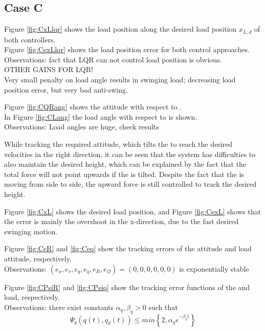 \newpage
\subsection*{Case C}

Figure \ref{fig:CxLlqr} shows the load position along the desired load position $ x_{L,d} $ of both controllers.\\
Figure \ref{fig:CexLlqr} shows the load position error for both control approaches.\\
Observations: fact that LQR can not control load position is obvious.\\
OTHER GAINS FOR LQR!\\
Very small penalty on load angle results in swinging load; decreasing load position error, but very bad anti-swing. 

Figure \ref{fig:CQRang} shows the  attitude with respect to \IF.\\
In Figure \ref{fig:CLang} the load angle with respect to \BF is shown. \\
Observations: Load angles are huge, check results

While tracking the required  attitude, which tilts the  to reach the desired velocities in the right direction, it can be seen that the system has difficulties to also maintain the desired height, which can be explained by the fact that the total force will not point upwards if the  is tilted. Despite the fact that the  is  moving from side to side, the upward force is still controlled to track the desired height. 

Figure \ref{fig:CxL} shows the desired load position, and Figure \ref{fig:CexL} shows that the error is mainly the overshoot in the x-direction, due to the fast desired swinging motion. 

Figure \ref{fig:CeR} and \ref{fig:Ceq} show the tracking errors of the  attitude and load attitude, respectively. \\
Observations: $(e_x,e_v,e_q,e_{\dot{q}},e_R,e_\Omega)=(0,0,0,0,0,0) $ is exponentially stable

Figure \ref{fig:CPsiR} and \ref{fig:CPsiq} show the tracking error functions of the  and load, respectively. \\
Observations: there exist constants $ \alpha_q,\beta_q>0 $ such that
\begin{equation}\label{key}
\Psi_q(q(t),q_d(t)) \leq min\left\lbrace 2,\alpha_qe^{-\beta_qt}\right\rbrace 
\end{equation}

